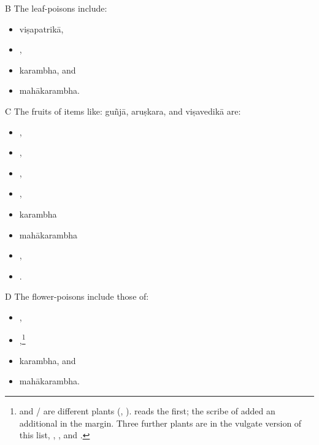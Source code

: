 \begin{translation}
        \item[B]
        The leaf-poisons include:
             \begin{itemize}            
        \item \gls{viṣapatrikā},
        \item {},
        \item \gls{karambha},
        and
        \item \gls{mahākarambha}.
            \end{itemize}
        \item[C]
        The fruits of items like:
        \gls{guñjā},
        \gls{aruṣkara},
        and
        \gls{viṣavedikā}
        are:
\begin{itemize}
         \item {},	
        \item {},
    \item {},
    \item {},
    \item \gls{karambha}
    \item \gls{mahākarambha}
    \item {},
    \item {}.
\end{itemize}
   
        \item[D]
        The flower-poisons include those of:
\begin{itemize}
 \item {}, 
 
 \item {},\footnote{ and / are
    different plants (, ).  reads 
    the first; the scribe
    of  added an additional  in the
    margin.  Three further plants are in the vulgate version of this list, 
    , , and .} 
   
    \item \gls{karambha}, and 
    
    \item \gls{mahākarambha}.
\end{itemize}


\end{translation}
